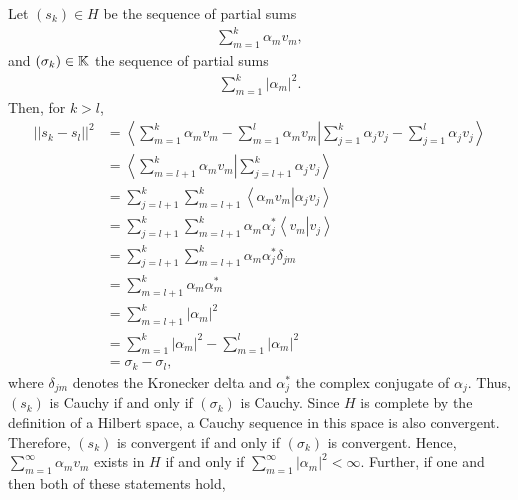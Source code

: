 \begin{questions}

\begin{solution}
Let $(s_k)\in H$ be the sequence of partial sums
\begin{align*}
\sum_{m=1}^{k}\alpha_mv_m,
\end{align*}
and $(\sigma_k)\in\mathbb{K}$ the sequence of partial sums
\begin{align*}
\sum_{m=1}^{k}|\alpha_m|^2.
\end{align*}
Then, for $k>l$,
\begin{align*}
\left|\left|s_k-s_l\right|\right|^2&=\left<\sum_{m=1}^{k}\alpha_mv_m-\sum_{m=1}^{l}\alpha_mv_m\left|\right.\sum_{j=1}^{k}\alpha_jv_j-\sum_{j=1}^{l}\alpha_jv_j\right>\\
&=\left<\sum_{m=l+1}^{k}\alpha_mv_m\left|\right.\sum_{j=l+1}^{k}\alpha_jv_j\right>\\
&=\sum_{j=l+1}^{k}\sum_{m=l+1}^{k}\left<\alpha_mv_m\left|\right.\alpha_jv_j\right>\\
&=\sum_{j=l+1}^{k}\sum_{m=l+1}^{k}\alpha_m\alpha_j^*\left<v_m\left|\right.v_j\right>\\
&=\sum_{j=l+1}^{k}\sum_{m=l+1}^{k}\alpha_m\alpha_j^*\delta_{jm}\\
&=\sum_{m=l+1}^{k}\alpha_m\alpha_m^*\\
&=\sum_{m=l+1}^{k}|\alpha_m|^2\\
&=\sum_{m=1}^{k}|\alpha_m|^2-\sum_{m=1}^{l}|\alpha_m|^2\\
&=\sigma_k-\sigma_l,
\end{align*}
where $\delta_{jm}$ denotes the Kronecker delta and $\alpha_j^*$ the complex conjugate of $\alpha_j$. Thus, $(s_k)$ is Cauchy if and only if $(\sigma_k)$ is Cauchy. Since $H$ is complete by the definition of a Hilbert space, a Cauchy sequence in this space is also convergent. Therefore, $(s_k)$ is convergent if and only if $(\sigma_k)$ is convergent. Hence, $\sum_{m=1}^{\infty}\alpha_mv_m$ exists in $H$ if and only if $\sum_{m=1}^{\infty}|\alpha_m|^2<\infty$. Further, if one and then both of these statements hold,

\end{solution}
\end{questions}
